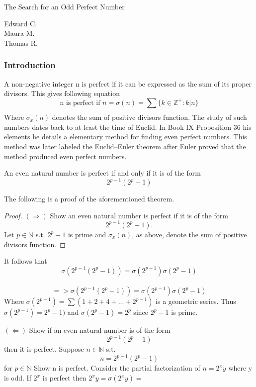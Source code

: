 \documentclass[12pt]{beamer}
\begin{document}
\begin{frame}
\begin{center}
	\Large
	The Search for an Odd Perfect Number
\end{center}

\begin{flushright}
	Edward C.\\
	\vspace{2 mm}
	Maura M.\\
	\vspace{2 mm}
	Thomas R.\\
\end{flushright}
\end{frame}
\begin{frame}
\frametitle{Introduction}
	A non-negative integer n is perfect if it can be expressed as the sum of its proper divisors. This gives following equation 
	$$\text{n is perfect if } n = \sigma(n) = \sum_{}{}\{k \in \mathbb{Z}^+ : k|n\}$$  Where $\sigma_x (n)$ 
	denotes the sum of positive divisors function.  The study of such numbers dates back to at least the 
	time of Euclid. In Book IX Proposition 36 his elements he details a elementary method for finding even
	perfect numbers.  This method was later labeled the Euclid–Euler theorem
	after Euler proved that the method produced even perfect numbers.
\end{frame}

\begin{frame}
\begin{theorem}
		An even natural number is perfect if and only if it is of the form $$2^{p-1} (2^{p} - 1)$$
	\end{theorem} 
The following is a proof of the  aforementioned theorem.	
	\begin{proof}
	$(\Rightarrow)$
			Show an even natural number is perfect if it is of the form  $$2^{p-1} (2^{p} - 1).$$
			Let $p \in \mathbb{N}$ s.t. $2^{p}-1$ is prime and $\sigma_x (n)$, as above, denote the sum of positive divisors function.
	\end{proof}
\end{frame}	

\begin{frame}
It follows that $$\sigma (2^{p-1}(2^{p}-1))=\sigma (2^{p-1})\sigma (2^{p}-1)$$ \\ 
		$$ => \sigma (2^{p-1}(2^{p}-1))=\sigma (2^{p-1})\sigma (2^{p}-1)$$
			Where $\sigma (2^{p-1}) = \sum{}{}(1 + 2 + 4 + ... + 2^{p-1})$ is a geometric series.\newline
			Thus $\sigma (2^{p-1}) = 2^{p}-1)$ and $\sigma (2^{p}-1) = 2^{p}$ since $2^{p}-1$ is prime.
		
\end{frame}	
\begin{frame}
$(\Leftarrow)$
			Show if an even natural number is of the form  $$2^{p-1} (2^{p} - 1)$$ then it is perfect.
			Suppose $n \in \mathbb{N}$ s.t. $$n = 2^{p-1} (2^{p} - 1)$$ for $p \in \mathbb{N}$
			Show n is perfect.
			Consider the partial factorization of $n = 2^{x}y$ where y is odd.
			If $2^{x}$ is perfect then $2^{x}y = \sigma (2^{x}y) = $
 
	
\end{frame}	
\end{document}
